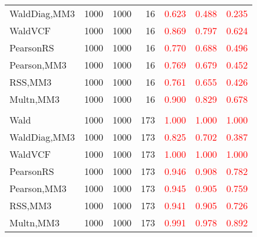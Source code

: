 \documentclass[
]{article}
\begin{document}
\begin{table}[H]
{\begin{tabular}[t]{lrrrrrr}
\hspace{1em}WaldDiag,MM3 & 1000 & 1000 & 16 & \textcolor{red}{0.623} & \textcolor{red}{0.488} & \textcolor{red}{0.235}\\
\hspace{1em}WaldVCF & 1000 & 1000 & 16 & \textcolor{red}{0.869} & \textcolor{red}{0.797} & \textcolor{red}{0.624}\\
\hspace{1em}PearsonRS & 1000 & 1000 & 16 & \textcolor{red}{0.770} & \textcolor{red}{0.688} & \textcolor{red}{0.496}\\
\hspace{1em}Pearson,MM3 & 1000 & 1000 & 16 & \textcolor{red}{0.769} & \textcolor{red}{0.679} & \textcolor{red}{0.452}\\
\hspace{1em}RSS,MM3 & 1000 & 1000 & 16 & \textcolor{red}{0.761} & \textcolor{red}{0.655} & \textcolor{red}{0.426}\\
\hspace{1em}Multn,MM3 & 1000 & 1000 & 16 & \textcolor{red}{0.900} & \textcolor{red}{0.829} & \textcolor{red}{0.678}\\
\addlinespace[0.3em]
\multicolumn{7}{l}{\textbf{3F 15V}}\\
\hspace{1em}Wald & 1000 & 1000 & 173 & \textcolor{red}{1.000} & \textcolor{red}{1.000} & \textcolor{red}{1.000}\\
\hspace{1em}WaldDiag,MM3 & 1000 & 1000 & 173 & \textcolor{red}{0.825} & \textcolor{red}{0.702} & \textcolor{red}{0.387}\\
\hspace{1em}WaldVCF & 1000 & 1000 & 173 & \textcolor{red}{1.000} & \textcolor{red}{1.000} & \textcolor{red}{1.000}\\
\hspace{1em}PearsonRS & 1000 & 1000 & 173 & \textcolor{red}{0.946} & \textcolor{red}{0.908} & \textcolor{red}{0.782}\\
\hspace{1em}Pearson,MM3 & 1000 & 1000 & 173 & \textcolor{red}{0.945} & \textcolor{red}{0.905} & \textcolor{red}{0.759}\\
\hspace{1em}RSS,MM3 & 1000 & 1000 & 173 & \textcolor{red}{0.941} & \textcolor{red}{0.905} & \textcolor{red}{0.726}\\
\hspace{1em}Multn,MM3 & 1000 & 1000 & 173 & \textcolor{red}{0.991} & \textcolor{red}{0.978} & \textcolor{red}{0.892}\\
\bottomrule
\end{tabular}}
\endgroup{}
\end{table}
\end{document}
